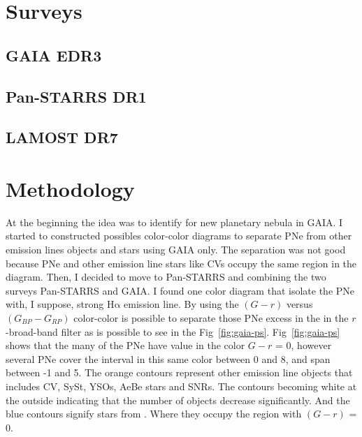 \documentclass{article}
\newcommand\ha{\ensuremath{\mathrm{H\alpha}}}
\begin{document}
\section{Surveys}
\label{sec:surveys}

\subsection{GAIA EDR3}
\label{sec:gaia}

\subsection{Pan-STARRS DR1}
\label{sec:gaia}

\subsection{LAMOST DR7}
\label{sec:gaia}

\section{Methodology}
\label{sec:surveys}

At the beginning the idea was to identify for new planetary nebula in GAIA.
I started to constructed possibles color-color diagrams to separate PNe from
other emission lines objects and stars using GAIA only. The separation was not
good because PNe and other emission line stars like CVs occupy the same region
in the diagram. Then, I decided to move to Pan-STARRS and combining the two
surveys Pan-STARRS and GAIA. I found one color diagram that isolate the PNe
with, I suppose, strong \ha{} emission line. By using the \((G - r)\) versus \((G_{BP} - G_{RP})\)
color-color is possible to separate those PNe excess in the in the $r$-broad-band
filter as is possible to see in the Fig~\ref{fig:gaia-ps}. Fig~\ref{fig:gaia-ps}
shows that the many of the PNe have value in the color \(G - r\) = 0, however several
PNe cover the interval in this same color between 0 and 8, and span between -1 and 5.
The orange contours represent other emission line objects that includes CV, SySt,
YSOs, AeBe stars and SNRs. The contours becoming white at the outside indicating
that the number of objects decrease significantly. And the blue contours signify
stars from \citet{Smart:2021}. Where they occupy the region with \((G - r)\) = 0.
\end{document}
